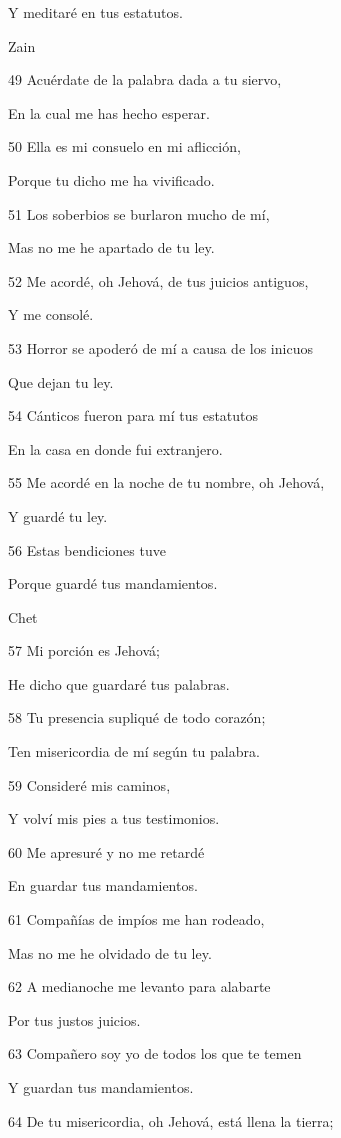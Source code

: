 \par Y meditaré en tus estatutos.
\par Zain
\par 49 Acuérdate de la palabra dada a tu siervo,
\par En la cual me has hecho esperar.
\par 50 Ella es mi consuelo en mi aflicción,
\par Porque tu dicho me ha vivificado.
\par 51 Los soberbios se burlaron mucho de mí,
\par Mas no me he apartado de tu ley.
\par 52 Me acordé, oh Jehová, de tus juicios antiguos,
\par Y me consolé.
\par 53 Horror se apoderó de mí a causa de los inicuos
\par Que dejan tu ley.
\par 54 Cánticos fueron para mí tus estatutos
\par En la casa en donde fui extranjero.
\par 55 Me acordé en la noche de tu nombre, oh Jehová,
\par Y guardé tu ley.
\par 56 Estas bendiciones tuve
\par Porque guardé tus mandamientos.
\par Chet
\par 57 Mi porción es Jehová;
\par He dicho que guardaré tus palabras.
\par 58 Tu presencia supliqué de todo corazón;
\par Ten misericordia de mí según tu palabra.
\par 59 Consideré mis caminos,
\par Y volví mis pies a tus testimonios.
\par 60 Me apresuré y no me retardé
\par En guardar tus mandamientos.
\par 61 Compañías de impíos me han rodeado,
\par Mas no me he olvidado de tu ley.
\par 62 A medianoche me levanto para alabarte
\par Por tus justos juicios.
\par 63 Compañero soy yo de todos los que te temen
\par Y guardan tus mandamientos.
\par 64 De tu misericordia, oh Jehová, está llena la tierra;
